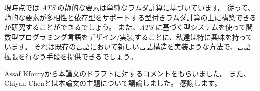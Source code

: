 \documentclass[submit,techreq,noauthor,onecolumn]{ipsj}
\begin{document}
現時点では {\it ATS} の静的な要素は単純なラムダ計算に基づいています。
従って、静的な要素が多相性と依存型をサポートする型付きラムダ計算の上に構築できるか研究することができるでしょう。
また、{\it ATS} に基づく型システムを使って関数型プログラミング言語をデザイン/実装することに、私達は特に興味を持っています。
それは既存の言語において新しい言語構造を実装ような方法で、言語拡張を行なう手段を提供できるでしょう。

\begin{acknowledgment}
Assaf Kfouryから本論文のドラフトに対するコメントをもらいました。
また、Chiyan Chenとは本論文の主題について議論しました。
感謝します。
\end{acknowledgment}

\end{document}

